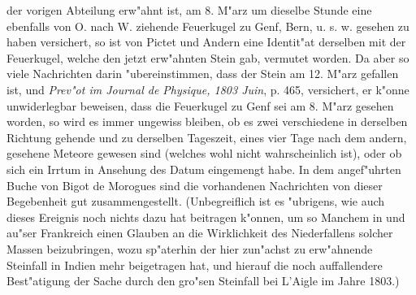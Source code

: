 \documentclass[a4paper, 11pt, oneside, polutonikogreek, german]{article}
\begin{document}
der vorigen Abteilung erw"ahnt ist, am 8. M"arz um dieselbe Stunde eine ebenfalls von O. nach W. ziehende Feuerkugel zu Genf, Bern, u. s. w. gesehen zu haben versichert, so ist von Pictet und Andern eine Identit"at derselben mit der Feuerkugel, welche den jetzt erw"ahnten Stein gab, vermutet worden. Da aber so viele Nachrichten darin "ubereinstimmen, dass der Stein am 12. M"arz gefallen ist, und \emph{Prev"ot im Journal de Physique, 1803 Juin}, p. 465, versichert, er k"onne unwiderlegbar beweisen, dass die Feuerkugel zu Genf sei am 8. M"arz gesehen worden, so wird es immer ungewiss bleiben, ob es zwei verschiedene in derselben Richtung gehende und zu derselben Tageszeit, eines vier Tage nach dem andern, gesehene Meteore gewesen sind (welches wohl nicht wahrscheinlich ist), oder ob sich ein Irrtum in Ansehung des Datum eingemengt habe. In dem angef"uhrten Buche von Bigot de Morogues sind die vorhandenen Nachrichten von dieser Begebenheit gut zusammengestellt. (Unbegreiflich ist es "ubrigens, wie auch dieses Ereignis noch nichts dazu hat beitragen k"onnen, um so Manchem in und au"ser Frankreich einen Glauben an die Wirklichkeit des Niederfallens solcher Massen beizubringen, wozu sp"aterhin der hier zun"achst zu erw"ahnende Steinfall in Indien mehr beigetragen hat, und hierauf die noch auffallendere Best"atigung der Sache durch den gro"sen Steinfall bei L'Aigle im Jahre 1803.)
\end{document}
